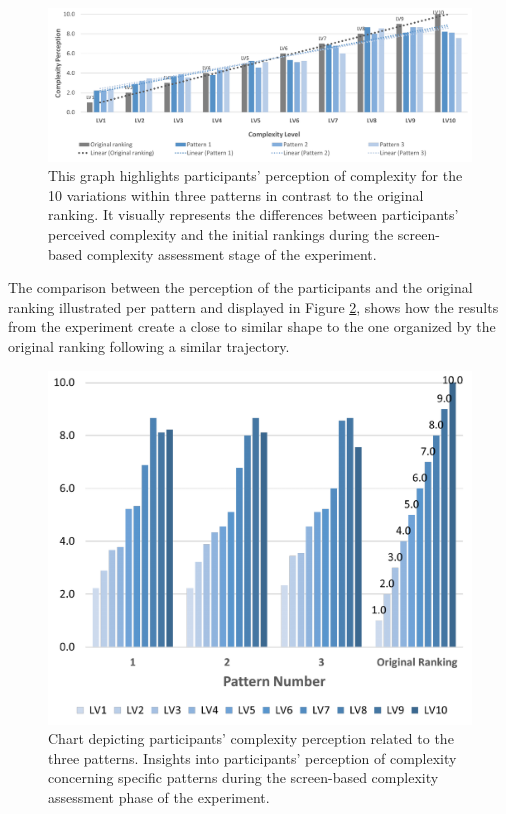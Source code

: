     \begin{figure}[htb]
      \centering
      \includegraphics[width= \linewidth, trim=0 0 0 0]{Images/ComplexityPerceptionPerLevel}
      \caption{This graph highlights participants' perception of complexity for the 10 variations within three patterns in contrast to the original ranking. It visually represents the differences between participants' perceived complexity and the initial rankings during the screen-based complexity assessment stage of the experiment.}
      \label{fig:ComplexityPerceptionPerLevel}
    \end{figure}


The comparison between the perception of the participants and the original ranking illustrated per pattern and displayed in Figure \ref{fig:ComplexityPerceptionChart}, shows how the results from the experiment create a close to similar shape to the one organized by the original ranking following a similar trajectory.


    \begin{figure}[htb]
        \centering
        \includegraphics[width=\linewidth]{Images/ComplexityPerceptionChart}
        \caption{Chart depicting participants' complexity perception related to the three patterns. Insights into participants' perception of complexity concerning specific patterns during the screen-based complexity assessment phase of the experiment.}
        \label{fig:ComplexityPerceptionChart}
    \end{figure}

